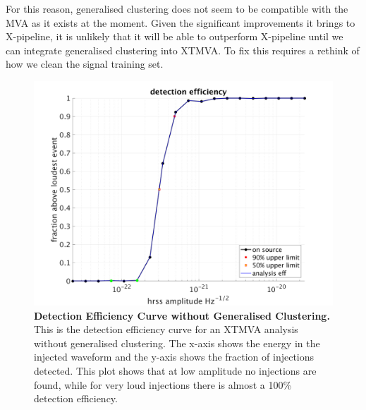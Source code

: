 \documentclass[11pt]{cuthesis}
\newcommand{\xp}{X-pipeline }
\begin{document}
For this reason, generalised clustering does not seem to be compatible with the MVA as it exists at the moment. Given the significant improvements it brings to X-pipeline, it is unlikely that it will be able to outperform \xp until we can integrate generalised clustering into XTMVA. To fix this requires a rethink of how we clean the signal training set.

\begin{figure} %
\begin{center}
\includegraphics[width=0.8\linewidth]{no_gc_eff_nsbh.png}
\end{center}
\caption{\textbf{Detection Efficiency Curve without Generalised Clustering.} This is the detection efficiency curve for an XTMVA analysis without generalised clustering. The x-axis shows the energy in the injected waveform and the y-axis shows the fraction of injections detected. This plot shows that at low amplitude no injections are found, while for very loud injections there is almost a 100\% detection efficiency. }
\label{fig:no gc eff}
\end{figure}
\end{document}
